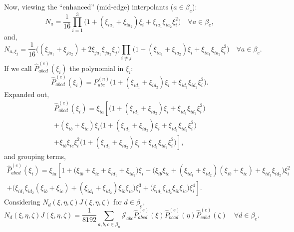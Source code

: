 \documentclass[11pt]{article} %
\begin{document}
Now, viewing the ``enhanced'' (mid-edge) interpolants ($a \in \beta_e$):
\begin{equation}
	N_a = \frac{1}{16} \prod_{i=1}^3 \bigg( 1 + (\xi_{ia_1} + \xi_{ia_2}) \xi_i + \xi_{ia_1} \xi_{ia_2} \xi_{i}^2 \bigg) \quad \forall a \in \beta_e,
\end{equation}
and,
\begin{equation}
	N_{a,\xi_j} = \frac{1}{16} \bigg((\xi_{ja_1} + \xi_{ja_2}) + 2 \xi_{ja_1} \xi_{ja_2} \xi_{j} \bigg) \prod_{i \neq j} \bigg( 1 + (\xi_{ia_1} + \xi_{ia_2}) \xi_i + \xi_{ia_1} \xi_{ia_2} \xi_{i}^2 \bigg) \quad \forall a \in \beta_e.
\end{equation}
If we call $\hat{P}^{(e)}_{abcd} (\xi_i)$ the polynomial in $\xi_i$:
\begin{equation}
	\hat{P}^{(e)}_{abcd} (\xi_i) = P^{(n)}_{abc} \bigg( 1 + (\xi_{id_1} + \xi_{id_2}) \xi_i + \xi_{id_1} \xi_{id_2} \xi_{i}^2 \bigg).
\end{equation}
Expanded out,
\begin{eqnarray}
	\hat{P}^{(e)}_{abcd} (\xi_i) = \xi_{ia} \left[\bigg( 1 + (\xi_{id_1} + \xi_{id_2}) \xi_i + \xi_{id_1} \xi_{id_2} \xi_{i}^2 \bigg) \right. \nonumber \\ \left. + (\xi_{ib} + \xi_{ic}) \xi_i \bigg( 1 + (\xi_{id_1} + \xi_{id_2}) \xi_i + \xi_{id_1} \xi_{id_2} \xi_{i}^2 \bigg) \right. \nonumber \\ \left. + \xi_{ib} \xi_{ic} \xi_i^2 \bigg( 1 + (\xi_{id_1} + \xi_{id_2}) \xi_i + \xi_{id_1} \xi_{id_2} \xi_{i}^2 \bigg) \right],
\end{eqnarray}
and grouping terms,
\begin{eqnarray}
	\hat{P}^{(e)}_{abcd} (\xi_i) = \xi_{ia} \left[ 1 + \bigg( \xi_{ib} + \xi_{ic} + \xi_{id_1} + \xi_{id_2} \bigg) \xi_i + \bigg( \xi_{ib} \xi_{ic} + (\xi_{id_1} + \xi_{id_2}) (\xi_{ib} + \xi_{ic}) + \xi_{id_1} \xi_{id_2} \bigg) \xi_{i}^2 \right. \nonumber \\ \left. + \bigg( \xi_{id_1} \xi_{id_2} (\xi_{ib} + \xi_{ic}) + (\xi_{id_1} + \xi_{id_2}) \xi_{ib} \xi_{ic} \bigg) \xi_i^3 + \bigg( \xi_{id_1} \xi_{id_2} \xi_{ib} \xi_{ic} \bigg) \xi_i^4 \right].
\end{eqnarray}
Considering $N_d ( \xi, \eta, \zeta ) J( \xi, \eta, \zeta )$ for $d \in \beta_e$,
\begin{equation}
	N_d ( \xi, \eta, \zeta ) J (\xi, \eta, \zeta) = \frac{1}{8192} \sum_{a,b,c \in \beta_n} \mathcal{J}_{abc} \hat{P}^{(e)}_{abcd} (\xi) \hat{P}^{(e)}_{bcad} (\eta) \hat{P}^{(e)}_{cabd} (\zeta) \quad \forall d \in \beta_e.
\end{equation}
\end{document}
